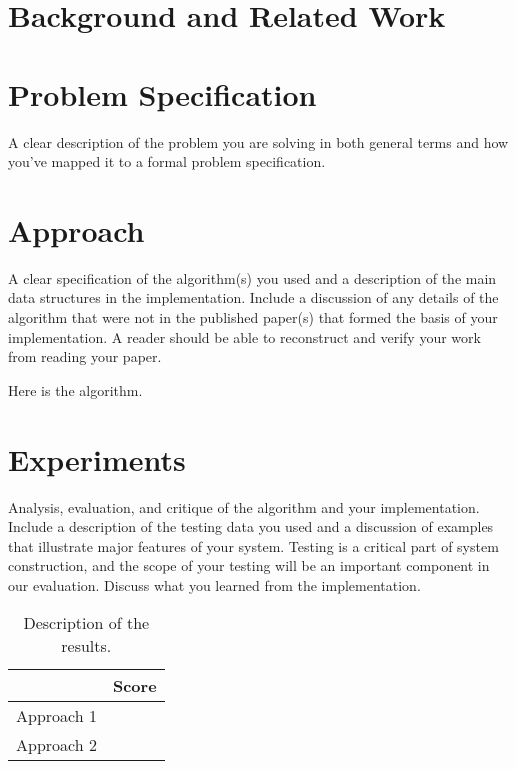 \documentclass[11pt]{article}
\begin{document}
\section{Background and Related Work}



\section{Problem Specification}

A clear description of the problem you are solving in both general terms
and how you've mapped it to a formal problem specification.


\section{Approach}

A clear specification of the algorithm(s) you used and a description
of the main data structures in the implementation. Include a
discussion of any details of the algorithm that were not in the
published paper(s) that formed the basis of your implementation. A
reader should be able to reconstruct and verify your work from reading
your paper.

\begin{algorithm}
  \begin{algorithmic}
    \EndProcedure{}
  \end{algorithmic}
  \caption{Here is the algorithm.}
\end{algorithm}



\section{Experiments}
Analysis, evaluation, and critique of the algorithm and your
implementation. Include a description of the testing data you used and
a discussion of examples that illustrate major features of your
system. Testing is a critical part of system construction, and the
scope of your testing will be an important component in our
evaluation. Discuss what you learned from the implementation.

\begin{table}
  \centering
  \begin{tabular}{ll}
    \toprule
    & Score \\
    \midrule
    Approach 1 & \\
    Approach 2 & \\
    \bottomrule
  \end{tabular}
  \caption{Description of the results.}
\end{table}
\end{document}
